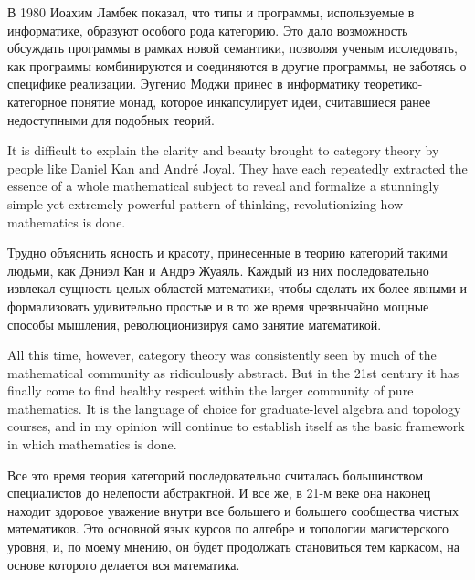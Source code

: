 \documentclass[CT4S-EN-RU]{subfiles}
\begin{document}
\begin{blockRUS}
В 1980 Иоахим Ламбек показал, что типы и программы, используемые в информатике, образуют особого рода категорию. Это дало возможность обсуждать программы в рамках новой семантики, позволяя ученым исследовать, как программы комбинируются и соединяются в другие программы, не заботясь о специфике реализации. Эугенио Моджи принес в информатику теоретико-категорное понятие монад, которое инкапсулирует идеи, считавшиеся ранее недоступными для подобных теорий. 
\end{blockRUS}

\begin{blockENG}
It is difficult to explain the clarity and beauty brought to category theory by people like Daniel Kan and Andr\'{e} Joyal. They have each repeatedly extracted the essence of a whole mathematical subject to reveal and formalize a stunningly simple yet extremely powerful pattern of thinking, revolutionizing how mathematics is done.
\end{blockENG}

\begin{blockRUS}
Трудно объяснить ясность и красоту, принесенные в теорию категорий такими людьми, как Дэниэл Кан и Андрэ Жуаяль. Каждый из них последовательно извлекал сущность целых областей математики, чтобы сделать их более явными и формализовать удивительно простые и в то же время чрезвычайно мощные способы мышления, революционизируя само занятие математикой. 
\end{blockRUS}

\begin{blockENG}
All this time, however, category theory was consistently seen by much of the mathematical community as ridiculously abstract. But in the 21st century it has finally come to find healthy respect within the larger community of pure mathematics. It is the language of choice for graduate-level algebra and topology courses, and in my opinion will continue to establish itself as the basic framework in which mathematics is done.
\end{blockENG}

\begin{blockRUS}
Все это время теория категорий последовательно считалась большинством специалистов до нелепости абстрактной. И все же, в 21-м веке она наконец находит здоровое уважение внутри все большего и большего сообщества чистых математиков. Это основной язык курсов по алгебре и топологии магистерского уровня, и, по моему мнению, он будет продолжать становиться тем каркасом, на основе которого делается вся математика. 
\end{blockRUS}
\end{document}
